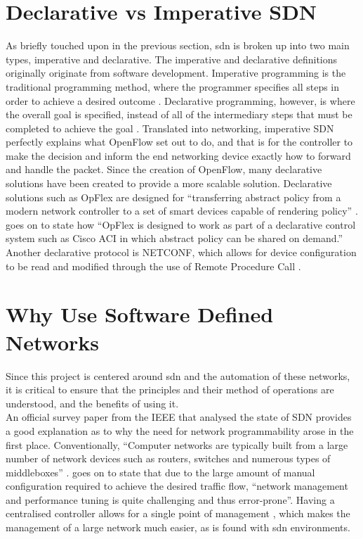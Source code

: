 \section{Declarative vs Imperative SDN}
\label{litreview:declarativevsimperative}
As briefly touched upon in the
previous section, \gls{sdn} is broken up into two main types, imperative and
declarative. The imperative and declarative definitions originally originate from
software development. Imperative programming is the traditional programming
method, where the programmer specifies all steps in order to achieve a desired
outcome \citep{LATIF2020102563}. Declarative programming, however, is where the overall goal is
specified, instead of all of the intermediary steps that must be completed to
achieve the goal  \citep{LATIF2020102563}. Translated into networking,
imperative SDN perfectly explains what OpenFlow set out to do, and that is for
the controller to make the decision and inform the end networking device
exactly how to forward and handle the packet. Since the creation of OpenFlow,
many declarative solutions have been created to provide a more scalable
solution. Declarative solutions such as OpFlex are designed for ``transferring
abstract policy from a modern network controller to a set of smart devices
capable of rendering policy'' \citep{bhardwaj_2020}. \citeauthor{bhardwaj_2020}
goes on to state how ``OpFlex is designed to work as part of a declarative
control system such as Cisco ACI in which abstract policy can be shared on
demand.'' Another declarative protocol is NETCONF, which allows for device
configuration to be read and modified through the use of Remote Procedure Call
\citep{LATIF2020102563}.

\section{Why Use Software Defined Networks}
\label{litreview:overview}

Since this project is centered around \gls{sdn} and
the
automation of these networks, it is critical to ensure that the principles
and
their method of operations are understood, and the benefits of using it.\\
An official survey paper from the IEEE that analysed the state of SDN provides
a good explanation as to why the need for network programmability arose in the
first place. Conventionally, ``Computer networks are typically built from a
large number of network devices such as routers, switches and numerous types of
middleboxes'' \citep{1}. \citeauthor{1} goes on to state that due to the large
amount of manual configuration required to achieve the desired traffic flow,
“network management and performance tuning is quite challenging and thus
error-prone”.  Having a centralised controller allows for a single point of management \citep{7785187}, which makes the management of a large network much easier, as is found with \gls{sdn} environments.

